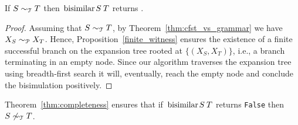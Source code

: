 \begin{theorem}[Completeness]
\label{thm:completeness}
  If $S \sim_\mathcal T T$ then $\bisimf S T$ returns
  .
\end{theorem}
%
\begin{proof}
  Assuming that $S \sim_\mathcal T T$, by Theorem~\ref{thm:cfst_vs_grammar}
  we have $X_{S} \sim_\mathcal P X_{T}$.  Hence, Proposition~\ref{finite_witness}
  ensures the existence of a finite successful branch on the
  expansion tree rooted at $\{(X_{S},X_{T})\}$, i.e., a branch
  terminating in an empty node.  Since our algorithm traverses the
  expansion tree using breadth-first search it will, eventually, reach
  the empty node and conclude the bisimulation positively.
\end{proof}

Theorem~\ref{thm:completeness} ensures that if $\bisimf S T$ returns
  \lstinline|False| then $S \not\sim_\mathcal T T$.



